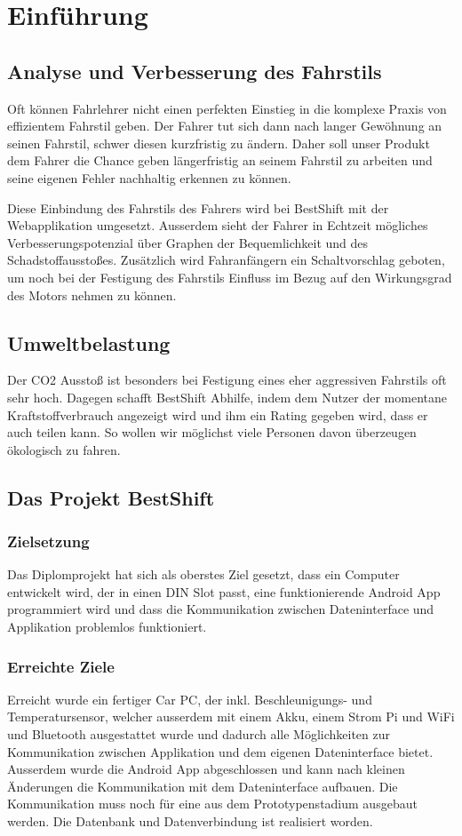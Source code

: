 \chapter{Einführung}

\section{Analyse und Verbesserung des Fahrstils}
Oft können Fahrlehrer nicht einen perfekten Einstieg in die komplexe Praxis von effizientem Fahrstil geben. Der Fahrer tut sich dann nach langer Gewöhnung an seinen Fahrstil, schwer diesen kurzfristig zu ändern. Daher soll unser Produkt dem Fahrer die Chance geben längerfristig an seinem Fahrstil zu arbeiten und seine eigenen Fehler nachhaltig erkennen zu können.

\newline
Diese Einbindung des Fahrstils des Fahrers wird bei BestShift mit der Webapplikation umgesetzt. Ausserdem sieht der Fahrer in Echtzeit mögliches Verbesserungspotenzial über Graphen der Bequemlichkeit und des Schadstoffausstoßes. Zusätzlich wird Fahranfängern ein Schaltvorschlag geboten, um noch bei der Festigung des Fahrstils Einfluss im Bezug auf den Wirkungsgrad des Motors nehmen zu können.

\newline
\section{Umweltbelastung}
Der CO2 Ausstoß ist besonders bei Festigung eines eher aggressiven Fahrstils oft sehr hoch. Dagegen schafft BestShift Abhilfe, indem dem Nutzer der momentane Kraftstoffverbrauch angezeigt wird und ihm ein Rating gegeben wird, dass er auch teilen kann. So wollen wir möglichst viele Personen davon überzeugen ökologisch zu fahren. 

\section{Das Projekt BestShift}
\subsection{Zielsetzung}
Das Diplomprojekt hat sich als oberstes Ziel gesetzt, dass ein Computer entwickelt wird, der in einen DIN Slot passt, eine funktionierende Android App programmiert wird und dass die Kommunikation zwischen Dateninterface und Applikation problemlos funktioniert.
\subsection{Erreichte Ziele}
Erreicht wurde ein fertiger Car PC, der inkl. Beschleunigungs- und Temperatursensor, welcher ausserdem mit einem Akku, einem Strom Pi und WiFi und Bluetooth ausgestattet wurde und dadurch alle Möglichkeiten zur Kommunikation zwischen Applikation und dem eigenen Dateninterface bietet.
Ausserdem wurde die Android App abgeschlossen und kann nach kleinen Änderungen die Kommunikation mit dem Dateninterface aufbauen.
Die Kommunikation muss noch für eine aus dem Prototypenstadium ausgebaut werden. Die Datenbank und Datenverbindung ist realisiert worden.


